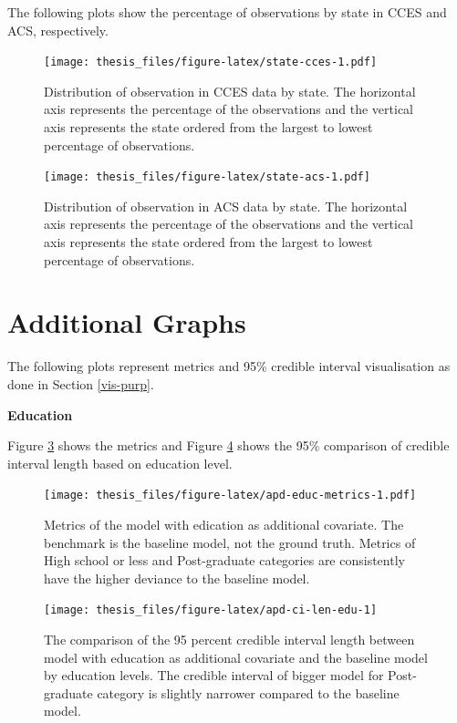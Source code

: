 \documentclass{monashthesis}
\begin{document}
The following plots show the percentage of observations by state in CCES and ACS, respectively.

\begin{figure}
\centering
\texttt{[image: thesis\_files/figure-latex/state-cces-1.pdf]}
\caption{\label{fig:state-cces}Distribution of observation in CCES data by state. The horizontal axis represents the percentage of the observations and the vertical axis represents the state ordered from the largest to lowest percentage of observations.}
\end{figure}

\begin{figure}
\centering
\texttt{[image: thesis\_files/figure-latex/state-acs-1.pdf]}
\caption{\label{fig:state-acs}Distribution of observation in ACS data by state. The horizontal axis represents the percentage of the observations and the vertical axis represents the state ordered from the largest to lowest percentage of observations.}
\end{figure}

\hypertarget{additional-graphs}{%
\section{Additional Graphs}\label{additional-graphs}}

The following plots represent metrics and 95\% credible interval visualisation as done in Section \ref{vis-purp}.

\textbf{Education}

Figure \ref{fig:apd-educ-metrics} shows the metrics and Figure \ref{fig:apd-ci-len-edu} shows the 95\% comparison of credible interval length based on education level.

\begin{figure}
\centering
\texttt{[image: thesis\_files/figure-latex/apd-educ-metrics-1.pdf]}
\caption{\label{fig:apd-educ-metrics}Metrics of the model with edication as additional covariate. The benchmark is the baseline model, not the ground truth. Metrics of High school or less and Post-graduate categories are consistently have the higher deviance to the baseline model.}
\end{figure}

\begin{figure}
\texttt{[image: thesis\_files/figure-latex/apd-ci-len-edu-1]} \caption{The comparison of the 95 percent credible interval length between model with education as additional covariate and the baseline model by education levels. The credible interval of bigger model for Post-graduate category is slightly narrower compared to the baseline model.}\label{fig:apd-ci-len-edu}
\end{figure}
\end{document}
